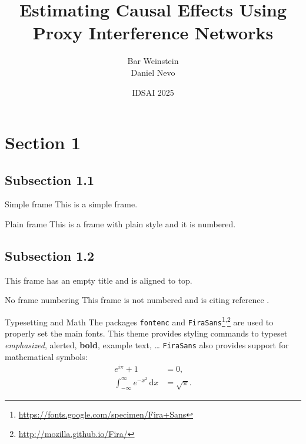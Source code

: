 \documentclass{beamer}
\title{Estimating Causal Effects Using \texorpdfstring{\\}{,} Proxy Interference Networks}
\author{Bar Weinstein \texorpdfstring{\\}{,} Daniel Nevo}
\institute{Statistics \& OR \\ Tel Aviv University}
\date{IDSAI 2025}
\begin{document}
    \begin{frame}
        \maketitle
    \end{frame}
    
    \section{Section 1}
    \subsection{Subsection 1.1}
    \begin{frame}{Simple frame}
        This is a simple frame.
    \end{frame}

    \begin{frame}[plain]{Plain frame}
        This is a frame with plain style and it is numbered.
    \end{frame}
    
    \subsection{Subsection 1.2}
    \begin{frame}[t]
        This frame has an empty title and is aligned to top.
    \end{frame}
    
    \begin{frame}[noframenumbering]{No frame numbering}
        This frame is not numbered and is citing reference \cite{knuth74}.
    \end{frame}
    
    \begin{frame}{Typesetting and Math}
        \large The packages \texttt{fontenc} and \texttt{FiraSans}\footnote{\url{https://fonts.google.com/specimen/Fira+Sans}}\textsuperscript{,}\footnote{\url{http://mozilla.github.io/Fira/}} are used to properly set the main fonts.
        \vfill
        \normalsize
        This theme provides styling commands to typeset \emph{emphasized}, \alert{alerted}, \textbf{bold}, \textcolor{example}{example text}, \dots
        \vfill
        \texttt{FiraSans} also provides support for mathematical symbols:
        \begin{align*}
            e^{i\pi} + 1 & = 0, \\
            \int_{-\infty}^\infty e^{-x^2}\,\mathrm{d}x & = \sqrt{\pi}.
        \end{align*}
    \end{frame}
\end{document}
